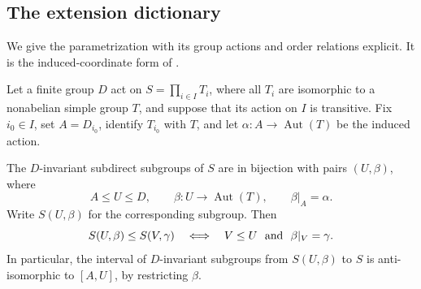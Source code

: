 \subsection{The extension dictionary}

We give the parametrization with its group actions and order relations
explicit.  It is the induced-coordinate form of
\cite[Proposition~2.2 and Lemma~2.3]{PalfyTwisted}.

\begin{proposition}\label{ext:dictionary}
Let a finite group $D$ act on $S=\prod_{i\in I}T_i$, where all $T_i$
are isomorphic to a nonabelian simple group $T$, and suppose that its
action on $I$ is transitive.  Fix $i_0\in I$, set $A=D_{i_0}$, identify
$T_{i_0}$ with $T$, and let
$\alpha:A\to\operatorname{Aut}(T)$ be the induced action.

The $D$-invariant subdirect subgroups of $S$ are in bijection with pairs
$(U,\beta)$, where
\[
 A\le U\le D,\qquad
 \beta:U\longrightarrow\operatorname{Aut}(T),\qquad
 \beta|_A=\alpha.
\]
Write $S(U,\beta)$ for the corresponding subgroup.  Then
\begin{equation}\label{ext:dictionary-order}
 S(U,\beta)\le S(V,\gamma)
 \quad\Longleftrightarrow\quad
 V\le U\ \hbox{ and }\ \beta|_V=\gamma.
\end{equation}
In particular, the interval of $D$-invariant subgroups from
$S(U,\beta)$ to $S$ is anti-isomorphic to $[A,U]$, by restricting
$\beta$.
\end{proposition}

